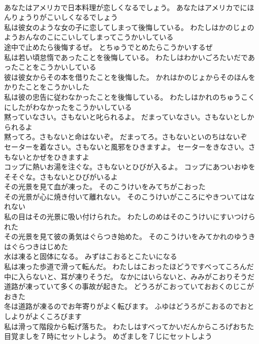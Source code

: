 \documentclass[8pt]{extreport}
\begin{document}
\begin{CJK}{UTF8}{min}
\\	あなたはアメリカで日本料理が恋しくなるでしょう。	あなたはアメリカでにほんりょうりがこいしくなるでしょう 
\\	私は彼女のような女の子に恋してしまって後悔している。	わたしはかのじょのようおんなのこにこいしてしまってこうかいしている 
\\	途中で止めたら後悔するぜ。	とちゅうでとめたらこうかいするぜ 
\\	私は若い頃怠惰であったことを後悔している。	わたしはわかいごろたいだであったことをこうかいしている 
\\	彼は彼女からその本を借りたことを後悔した。	かれはかのじょからそのほんをかりたことをこうかいした 
\\	私は彼の忠告に従わなかったことを後悔している。	わたしはかれのちゅうこくにしたがわなかったをこうかいしている 
\\	黙っていなさい。さもないと叱られるよ。	だまっていなさい。さもないとしかられるよ 
\\	黙ってろ。さもないと命はないぞ。	だまってろ。さもないといのちはないぞ 
\\	セーターを着なさい。さもないと風邪をひきますよ。	セーターをきなさい。さもないとかぜをひきますよ 
\\	コップに熱いお湯を注ぐな。さもないとひびが入るよ。	コップにあついおゆをそそぐな。さもないとひびがいるよ 
\\	その光景を見て血が凍った。	そのこうけいをみてちがこおった 
\\	その光景が心に焼き付いて離れない。	そのこうけいがこころにやきついてはなれない 
\\	私の目はその光景に吸い付けられた。	わたしのめはそのこうけいにすいつけられた 
\\	その光景を見て彼の勇気はぐらつき始めた。	そのこうけいをみてかれのゆうきはぐらつきはじめた 
\\	水は凍ると固体になる。	みずはこおるとこたいになる 
\\	私は凍った歩道で滑って転んだ。	わたしはこおったほどうですべってころんだ 
\\	中に入らないと、耳が凍りそうだ。	なかにはいらないと、みみがこおりそうだ 
\\	道路が凍っていて多くの事故が起きた。	どうろがこおっていておおくのじこがおきた 
\\	冬は道路が凍るのでお年寄りがよく転びます。	ふゆはどうろがこおるのでおとしよりがよくころびます 
\\	私は滑って階段から転げ落ちた。	わたしはすべってかいだんからころげおちた 
\\	目覚ましを７時にセットしよう。	めざましを７じにセットしよう 

\end{CJK}
\end{document}
